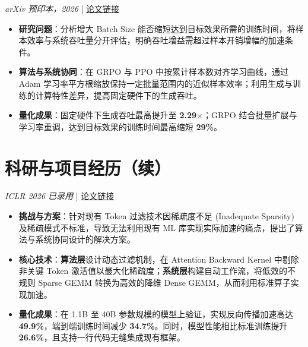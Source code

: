 \documentclass{resume}
\begin{document}
\textit{arXiv 预印本，2026} \quad | \quad \href{https://arxiv.org/abs/2608.29296}{论文链接}
\begin{itemize}[parsep=0.3ex]
  \item \textbf{研究问题}：分析增大 Batch Size 能否缩短达到目标效果所需的训练时间，将样本效率与系统吞吐量分开评估，明确吞吐增益需超过样本开销增幅的加速条件。
  \item \textbf{算法与系统协同}：在 GRPO 与 PPO 中按累计样本数对齐学习曲线，通过 Adam 学习率平方根缩放保持一定批量范围内的近似样本效率；利用生成与训练的计算特性差异，提高固定硬件下的生成吞吐。
  \item \textbf{量化成果}：固定硬件下生成吞吐最高提升至 \textbf{2.29$\times$}；GRPO 结合批量扩展与学习率重调，达到目标效果的训练时间最高缩短 \textbf{29\%}。
\end{itemize}

\vspace{0.1cm}

\newpage
\section{科研与项目经历（续）}
\vspace{0.08cm}
\textit{ICLR 2026 已录用} \quad | \quad \href{https://openreview.net/forum?id=eshXwEnENV}{论文链接}
\begin{itemize}[parsep=0.3ex]
  \item \textbf{挑战与方案}：针对现有 Token 过滤技术因稀疏度不足 (Inadequate Sparsity) 及稀疏模式不标准，导致无法利用现有 ML 库实现实际加速的痛点，提出了算法与系统协同设计的解决方案。
  \item \textbf{核心技术}：\textbf{算法层}设计动态过滤机制，在 Attention Backward Kernel 中剔除非关键 Token 激活值以最大化稀疏度；\textbf{系统层}构建自动工作流，将低效的不规则 Sparse GEMM 转换为高效的降维 Dense GEMM，从而利用标准算子实现加速。
  \item \textbf{量化成果}：在 1.1B 至 40B 参数规模的模型上验证，实现反向传播加速高达 \textbf{49.9\%}，端到端训练时间减少 \textbf{34.7\%}。同时，模型性能相比标准训练提升 \textbf{26.6\%}，且支持一行代码无缝集成现有框架。
\end{itemize}
\end{document}
